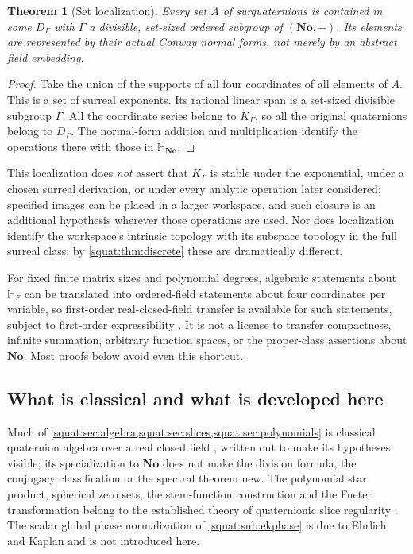 \documentclass[11pt,letterpaper]{article}
\numberwithin{equation}{section}
\newtheorem{theorem}{Theorem}[section]
\theoremstyle{definition}
\theoremstyle{remark}
\newcommand{\No}{\mathbf{No}}
\newcommand{\SQ}{\mathbb H_{\No}}
\newcommand{\HF}{\mathbb H_F}
\begin{document}
\begin{theorem}[Set localization]\label{squat:thm:localization}
Every set $A$ of surquaternions is contained in some $D_\Gamma$ with $\Gamma$ a
divisible, set-sized ordered subgroup of $(\No,+)$. Its elements are represented by their
actual Conway normal forms, not merely by an abstract field embedding.
\end{theorem}
\begin{proof}
Take the union of the supports of all four coordinates of all elements of $A$. This is a
set of surreal exponents. Its rational linear span is a set-sized divisible subgroup
$\Gamma$. All the coordinate series belong to $K_\Gamma$, so all the original
quaternions belong to $D_\Gamma$. The normal-form addition and multiplication identify
the operations there with those in $\SQ$.
\end{proof}

This localization does \emph{not} assert that $K_\Gamma$ is stable under the
exponential, under a chosen surreal derivation, or under every analytic operation later
considered; specified images can be placed in a larger workspace, and such closure is an
additional hypothesis wherever those operations are used. Nor does localization identify
the workspace's intrinsic topology with its subspace topology in the full surreal class:
by \cref{squat:thm:discrete} these are dramatically different.

For fixed finite matrix sizes and polynomial degrees, algebraic statements about $\HF$
can be translated into ordered-field statements about four coordinates per variable, so
first-order real-closed-field transfer is available for such statements, subject to
first-order expressibility \cite{Swan}. It is not a license to transfer compactness,
infinite summation, arbitrary function spaces, or the proper-class assertions about
$\No$. Most proofs below avoid even this shortcut.

\subsection{What is classical and what is developed here}\label{squat:sub:classical}
Much of \cref{squat:sec:algebra,squat:sec:slices,squat:sec:polynomials} is classical
quaternion algebra over a real closed field \cite{Voight}, written out to make its
hypotheses visible; its specialization to $\No$ does not make the division formula, the
conjugacy classification or the spectral theorem new. The polynomial star product,
spherical zero sets, the stem-function construction and the Fueter transformation belong
to the established theory of quaternionic slice regularity \cite{GP}. The scalar global
phase normalization of \cref{squat:sub:ekphase} is due to Ehrlich and Kaplan \cite{EK}
and is not introduced here.
\end{document}
